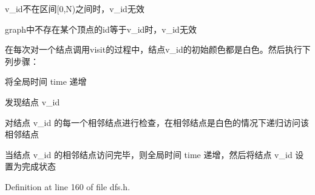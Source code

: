 \begin{DoxyItemize}
\item {\ttfamily v\+\_\+id}不在区间{\ttfamily \mbox{[}0,N)}之间时，{\ttfamily v\+\_\+id}无效
\item {\ttfamily graph}中不存在某个顶点的{\ttfamily id}等于{\ttfamily v\+\_\+id}时，{\ttfamily v\+\_\+id}无效
\end{DoxyItemize}

在每次对一个结点调用visit的过程中，结点v\+\_\+id的初始颜色都是白色。然后执行下列步骤：


\begin{DoxyItemize}
\item 将全局时间 time 递增
\item 发现结点 v\+\_\+id
\item 对结点 v\+\_\+id 的每一个相邻结点进行检查，在相邻结点是白色的情况下递归访问该相邻结点
\item 当结点 v\+\_\+id 的相邻结点访问完毕，则全局时间 time 递增，然后将结点 v\+\_\+id 设置为完成状态 
\end{DoxyItemize}

Definition at line 160 of file dfs.\+h.

